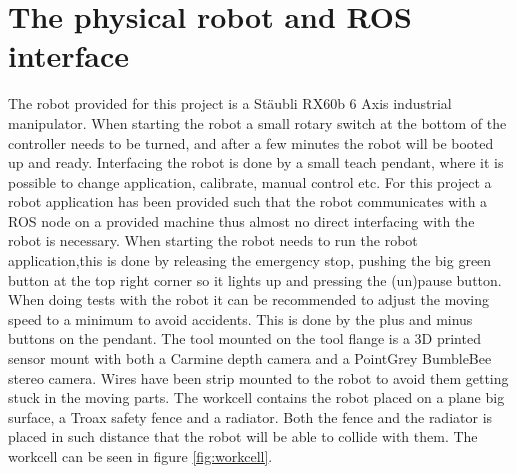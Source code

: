

\section{The physical robot and ROS interface}
\label{sec:robot_physical}
The robot provided for this project is a Stäubli RX60b 6 Axis industrial manipulator. When starting the robot a small rotary switch at the bottom of the controller needs to be turned, and after a few minutes the robot will be booted up and ready. Interfacing the robot is done by a small teach pendant, where it is possible to change application, calibrate, manual control etc. For this project a robot application has been provided such that the robot communicates with a ROS node on a provided machine thus almost no direct interfacing with the robot is necessary. When starting the robot needs to run the robot application,this is done by releasing the emergency stop, pushing the big green button at the top right corner so it lights up and pressing the (un)pause button. When doing tests with the robot it can be recommended to adjust the moving speed to a minimum to avoid accidents. This is done by the plus and minus buttons on the pendant.
The tool mounted on the tool flange is a 3D printed sensor mount with both a Carmine depth camera and a PointGrey BumbleBee stereo camera. Wires have been strip mounted to the robot to avoid them getting stuck in the moving parts. 
The workcell contains the robot placed on a plane big surface, a Troax safety fence and a radiator. Both the fence and the radiator is placed in such distance that the robot will be able to collide with them. The workcell can be seen in figure \ref{fig:workcell}.


